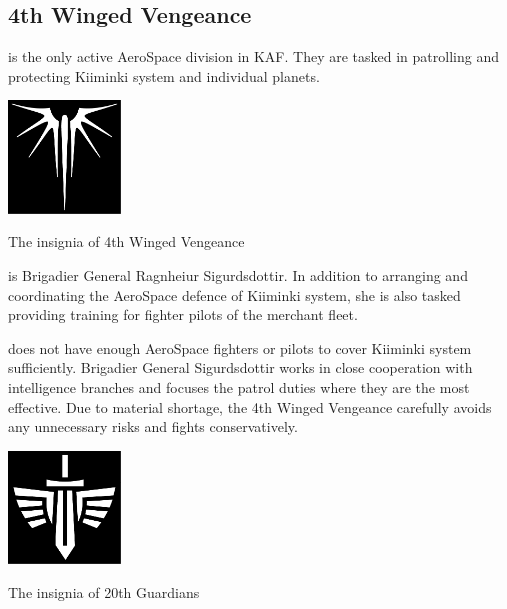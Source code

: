 \documentclass{tufte-book}
\begin{document}
\subsection{4th Winged Vengeance}

 is the only active AeroSpace division in
KAF. They are tasked in patrolling and protecting Kiiminki system and
individual planets.

\begin{marginfigure}[0\baselineskip]
  \includegraphics[width=3cm]{evil-wings}
  \caption{The insignia of 4th Winged Vengeance}
  \label{fig:winged_vengeance}
\end{marginfigure}

 is Brigadier General
Ragnhei\dh ur Sigurdsdottir. In addition to arranging and coordinating the
AeroSpace defence of Kiiminki system, she is also tasked providing training
for fighter pilots of the merchant fleet.

 does not have enough AeroSpace fighters or
pilots to cover Kiiminki system sufficiently. Brigadier General Sigurdsdottir
works in close cooperation with intelligence branches and focuses the patrol
duties where they are the most effective. Due to material shortage, the 4th
Winged Vengeance carefully avoids any unnecessary risks and fights
conservatively.

\bigskip
{}

\begin{marginfigure}[0\baselineskip]
  \includegraphics[width=3cm]{winged-sword}
  \caption{The insignia of 20th Guardians}
  \label{fig:guardians}
\end{marginfigure}
\end{document}
